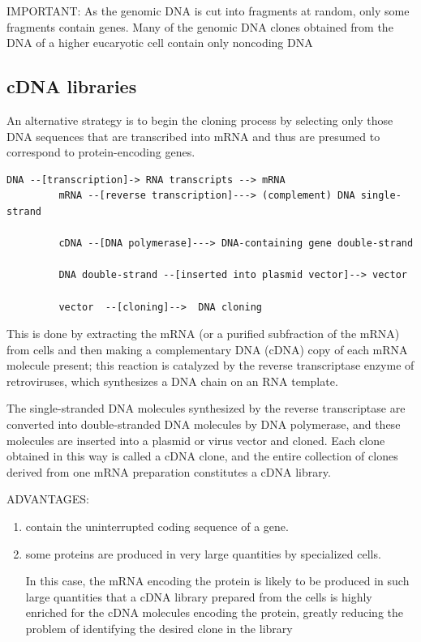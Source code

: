 IMPORTANT: As the genomic DNA is cut into fragments at random, only some
fragments contain genes. Many of the genomic DNA clones obtained from the DNA of
a higher eucaryotic cell contain only noncoding DNA


\subsection{cDNA libraries}
\label{sec:cDNA-libraries}

An alternative strategy is to begin the cloning process by selecting only those
DNA sequences that are transcribed into mRNA and thus are presumed to correspond
to protein-encoding genes. 

\begin{verbatim}
DNA --[transcription]-> RNA transcripts --> mRNA 
         mRNA --[reverse transcription]---> (complement) DNA single-strand

         cDNA --[DNA polymerase]---> DNA-containing gene double-strand
         
         DNA double-strand --[inserted into plasmid vector]--> vector

         vector  --[cloning]-->  DNA cloning
\end{verbatim}

This is done by extracting the mRNA (or a purified subfraction of the mRNA) from
cells and then making a complementary DNA (cDNA) copy of each mRNA molecule
present; this reaction is catalyzed by the reverse transcriptase enzyme of
retroviruses, which synthesizes a DNA chain on an RNA template. 

The single-stranded DNA molecules synthesized by the reverse transcriptase are
converted into double-stranded DNA molecules by DNA polymerase, and these
molecules are inserted into a plasmid or virus vector and cloned.
Each clone obtained in this way is called a cDNA clone, and the entire
collection of clones derived from one mRNA preparation constitutes a cDNA
library.

ADVANTAGES:
\begin{enumerate}
  \item contain the uninterrupted coding sequence of a gene.  

  \item  some proteins are produced in very large quantities by specialized
  cells. 
  
  In this case, the mRNA encoding the protein is likely to be produced in
  such large quantities that a cDNA library prepared from the cells is highly
  enriched for the cDNA molecules encoding the protein, greatly reducing the
  problem of identifying the desired clone in the library   
  
\end{enumerate}

